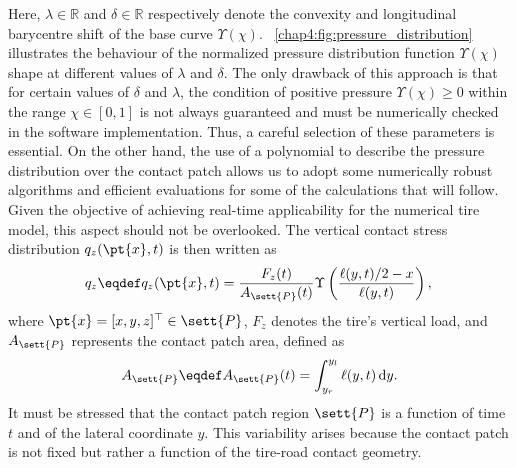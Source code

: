 %
Here, $\lambda \in \mathbb{R}$ and $\delta \in \mathbb{R}$ respectively denote the convexity and longitudinal barycentre shift of the base curve $\Upsilon(\chi)$. \figurename{}~\ref{chap4:fig:pressure_distribution} illustrates the behaviour of the normalized pressure distribution function $\Upsilon(\chi)$ shape at different values of $\lambda$ and $\delta$. The only drawback of this approach is that for certain values of $\delta$ and $\lambda$, the condition of positive pressure $\Upsilon(\chi) \ge 0$ within the range $\chi \in [0,1]$ is not always guaranteed and must be numerically checked in the software implementation. Thus, a careful selection of these parameters is essential. On the other hand, the use of a polynomial to describe the pressure distribution over the contact patch allows us to adopt some numerically robust algorithms and efficient evaluations for some of the calculations that will follow. Given the objective of achieving real-time applicability for the numerical tire model, this aspect should not be overlooked. The vertical contact stress distribution $q_z(\pt{x},t)$ is then written as
%
\begin{equation}
  q_z \eqdef q_z(\pt{x},t) = \dfrac{F_z(t)}{A_\sett{P}(t)}\Upsilon\left(\dfrac{\ell(y,t)/2-x}{\ell(y,t)}\right), \\
  \label{chap4:eq:vertical_stress}
\end{equation}
%
where $\pt{x} = [x,y,z]^\top \in \sett{P}$, $F_z$ denotes the tire's vertical load, and $A_\sett{P}$ represents the contact patch area, defined as
%
\begin{equation}
  A_\sett{P} \eqdef A_\sett{P}(t) = \displaystyle\int_{y_r}^{y_l} \ell(y,t)\,\mathrm{d}y.
\end{equation}
%
It must be stressed that the contact patch region $\sett{P}$ is a function of time $t$ and of the lateral coordinate $y$. This variability arises because the contact patch is not fixed but rather a function of the tire-road contact geometry.

